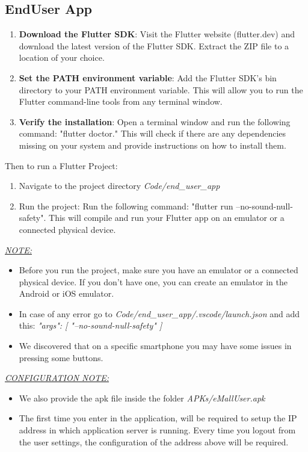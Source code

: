 \subsection{EndUser App}
\begin{enumerate}
    \item \textbf{Download the Flutter SDK}: Visit the Flutter website (flutter.dev) and download the latest version of the Flutter SDK. Extract the ZIP file to a location of your choice.
    \item \textbf{Set the PATH environment variable}: Add the Flutter SDK's bin directory to your PATH environment variable. This will allow you to run the Flutter command-line tools from any terminal window.
    \item \textbf{Verify the installation}: Open a terminal window and run the following command: "flutter doctor." This will check if there are any dependencies missing on your system and provide instructions on how to install them.
\end{enumerate}
Then to run a Flutter Project:
\begin{enumerate}
    \item Navigate to the project directory \emph{Code/end\_user\_app}
    \item Run the project: Run the following command: "flutter run --no-sound-null-safety". This will compile and run your Flutter app on an emulator or a connected physical device.
\end{enumerate}
\emph{\underline{NOTE:}}
\begin{itemize}
    \item Before you run the project, make sure you have an emulator or a connected physical device. If you don't have one, you can create an emulator in the Android or iOS emulator.
    \item In case of any error go to \emph{Code/end\_user\_app/.vscode/launch.json} and add this: \emph{            "args": [
                "--no-sound-null-safety"
               ]} 
    \item We discovered that on a specific smartphone you may have some issues in pressing some buttons.
\end{itemize}
\emph{\underline{CONFIGURATION NOTE:}}
\begin{itemize}
    \item We also provide the apk file inside the folder \emph{APKs/eMallUser.apk}
    \item The first time you enter in the application, will be required to setup the IP address in which application server is running. Every time you logout from the user settings, the configuration of the address above will be required.
\end{itemize}
